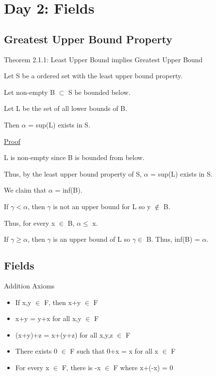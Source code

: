 \newpage
\section[Day 2: Fields]{Day 2: Fields}





\subsection{Greatest Upper Bound Property}

{ \color{red} Theorem 2.1.1: Least Upper Bound implies Greatest Upper Bound }

\begin{adjustbox}{minipage=14cm, right}
	Let S be a ordered set with the least upper bound property.

	Let non-empty B $\subset$ S be bounded below.

	Let L be the set of all lower bounds of B.

	Then $\alpha$ = sup(L) exists in S.
\end{adjustbox}

{ \color{magenta} \underline{Proof} }

L is non-empty since B is bounded from below.

Thus, by the least upper bound property of S, $\alpha$ = sup(L) exists in S.

We claim that $\alpha$ = inf(B).

If $\gamma < \alpha$, then $\gamma$ is not an upper bound for L so y $\not \in$ B.

Thus, for every x $\in$ B, $\alpha \leq$ x.

If $\gamma \geq \alpha$, then $\gamma$ is an upper bound of L so $\gamma \in$ B.
Thus, inf(B) = $\alpha$.





\subsection{Fields}

Addition Axioms
\begin{itemize}[leftmargin=1cm]
	\item If x,y $\in$ F, then x+y $\in$ F
	
	\item x+y = y+x for all x,y $\in$ F
	
	\item (x+y)+z = x+(y+z) for all x,y,z $\in$ F
	
	\item There exists 0 $\in$ F such that 0+x = x for all x $\in$ F
	
	\item For every x $\in$ F, there is -x $\in$ F where x+(-x) = 0
\end{itemize}

